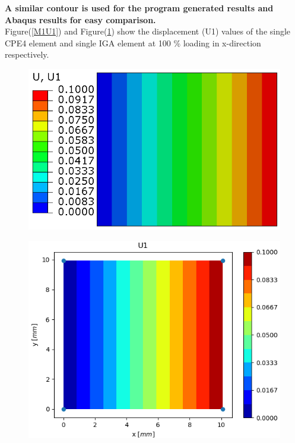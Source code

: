 \documentclass[11pt]{article}
\begin{document}
\textbf{A similar contour is used for the program generated results and Abaqus results for easy comparison. }\\
Figure(\ref{M1U1}) and Figure(\ref{M1U1_IGA}) show the displacement (U1) values of the single CPE4 element and single IGA element at 100 \% loading in x-direction respectively. \\
\begin{figure}[H]
	\centering
	\begin{minipage}{.5\textwidth}
		\centering
		\includegraphics[width=1\linewidth]{M1U1.png}
		\label{M1U1}
	\end{minipage}%
	\begin{minipage}{.5\textwidth}
		\centering
		\includegraphics[width=1\linewidth]{M1U1_IGA.png}
		\label{M1U1_IGA}
	\end{minipage}
\end{figure}
\end{document}
